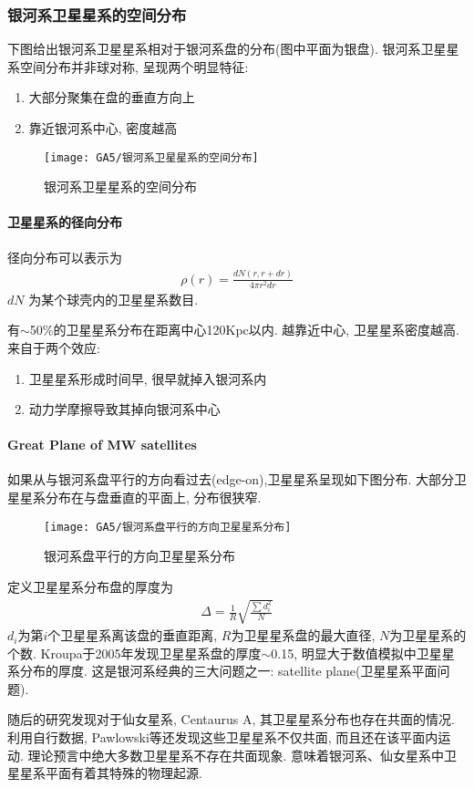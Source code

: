 \subsubsection{银河系卫星星系的空间分布}

下图给出银河系卫星星系相对于银河系盘的分布(图中平面为银盘). 银河系卫星星系空间分布并非球对称, 呈现两个明显特征: 
\begin{enumerate}\small
    \item 大部分聚集在盘的垂直方向上
    \item 靠近银河系中心, 密度越高
\end{enumerate}

\quad

\begin{figure}[!htb]
    \centering
    \texttt{[image: GA5/银河系卫星星系的空间分布]}
    \caption{银河系卫星星系的空间分布}
\end{figure}

\paragraph{卫星星系的径向分布}
径向分布可以表示为
\begin{align*}
    \rho(r)=\frac{dN(r, r+dr)}{4\pi r^2 dr}
\end{align*}
$dN$ 为某个球壳内的卫星星系数目. 

有$\sim$50\%的卫星星系分布在距离中心120Kpc以内. 越靠近中心, 卫星星系密度越高. 来自于两个效应: 
\begin{enumerate}\small
    \item 卫星星系形成时间早, 很早就掉入银河系内
    \item 动力学摩擦导致其掉向银河系中心
\end{enumerate}

\paragraph{Great Plane of MW satellites}
如果从与银河系盘平行的方向看过去(edge-on),卫星星系呈现如下图分布. 大部分卫星星系分布在与盘垂直的平面上, 分布很狭窄. 

\begin{figure}[!htb]
    \centering
    \texttt{[image: GA5/银河系盘平行的方向卫星星系分布]}
    \caption{银河系盘平行的方向卫星星系分布}
\end{figure}

定义卫星星系分布盘的厚度为
\begin{align*}
    \Delta=\frac{1}{R}\sqrt{\frac{\sum d_i^2}{N}}
\end{align*}
$d_i$为第$i$个卫星星系离该盘的垂直距离, $R$为卫星星系盘的最大直径, $N$为卫星星系的个数. Kroupa于2005年发现卫星星系盘的厚度$\sim$0.15, 明显大于数值模拟中卫星星系分布的厚度. 这是银河系经典的三大问题之一: satellite plane(卫星星系平面问题).

\small
随后的研究发现对于仙女星系, Centaurus A, 其卫星星系分布也存在共面的情况. 利用自行数据, Pawlowski等还发现这些卫星星系不仅共面, 而且还在该平面内运动. 理论预言中绝大多数卫星星系不存在共面现象. 意味着银河系、仙女星系中卫星星系平面有着其特殊的物理起源. 
\normalsize